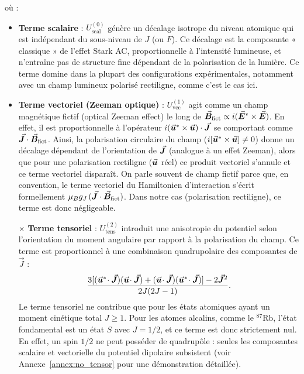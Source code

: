 où : 
\begin{itemize}[label = $\bullet$]
  \item \textbf{Terme scalaire} : $U_{\mathrm{scal}}^{(0)}$ génère un décalage isotrope du niveau atomique qui est indépendant du sous-niveau de $J$ (ou $F$). Ce décalage est la composante « classique » de l’effet Stark AC, proportionnelle à l’intensité lumineuse, et n’entraîne pas de structure fine dépendant de la polarisation de la lumière. Ce terme domine dans la plupart des configurations expérimentales, notamment avec un champ lumineux polarisé rectiligne, comme c’est le cas ici.

  \item \textbf{Terme vectoriel (Zeeman optique)} : $U_{\mathrm{vec}}^{(1)}$ agit comme un champ magnétique fictif (optical Zeeman effect) le long de $\vec{{\bm{B}}}_{\rm fict}\propto i(\vec{{\bm{E}}}^\ast\times \vec{{\bm{E}}})$. En effet, il est proportionnelle à l’opérateur $i(\vec{{\bm{u}}}^\ast\times\vec{{\bm{u}}})\cdot\vec{{\bm{J}}}$ se comportant comme $\vec{{\bm{J}}}\cdot \vec{{\bm{B}}}_{\rm fict}$. Ainsi, la polarisation circulaire du champ ($i[\vec{{\bm{u}}}^\ast\times\vec{{\bm{u}}}]\neq 0$) donne un décalage dépendant de l’orientation de $\vec{{\bm{J}}}$ (analogue à un effet Zeeman), alors que pour une polarisation rectiligne ($\vec{{\bm{u}}}$ réel) ce produit vectoriel s’annule et ce terme vectoriel disparaît. On parle souvent de champ fictif parce que, en convention, le terme vectoriel du Hamiltonien d’interaction s’écrit formellement $\mu_B g_J\,(\vec{{\bm{J}}}\cdot\vec{{\bm{B}}}_{\rm fict})$. Dans notre cas (polarisation rectiligne), ce terme est donc négligeable.

  \item[$\times$] \textbf{Terme tensoriel} : $U_{\mathrm{tens}}^{(2)}$ introduit une anisotropie du potentiel selon l’orientation du moment angulaire par rapport à la polarisation du champ. Ce terme est proportionnel à une combinaison quadrupolaire des composantes de $\vec{J}$ :
\begin{eqnarray}
	\frac{3[(\vec{{\bm{u}}}^*\!\cdot \vec{{\bm{J}}})(\vec{{\bm{u}}}\!\cdot\vec{{\bm{J}}})+(\vec{{\bm{u}}}\!\cdot\vec{{\bm{J}}})(\vec{{\bm{u}}}^*\!\cdot \vec{{\bm{J}}})]-2\vec{{\bm{J}}}^2}{2J(2J-1)}.	
\end{eqnarray}
Le terme tensoriel ne contribue que pour les états atomiques ayant un moment cinétique total $J \geq 1$. Pour les atomes alcalins, comme le ${}^{87}\mathrm{Rb}$, l’état fondamental est un état $S$ avec $J = 1/2$, et ce terme est donc strictement nul. En effet, un spin $1/2$ ne peut posséder de quadrupôle : seules les composantes scalaire et vectorielle du potentiel dipolaire subsistent (voir Annexe~\ref{annex:no_tensor} pour une démonstration détaillée).




\end{itemize}
